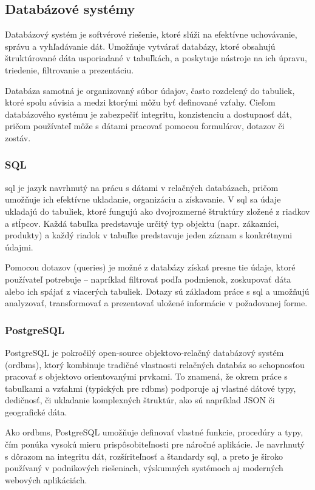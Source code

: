  \subsection{Databázové systémy}
 Databázový systém je softvérové riešenie, ktoré slúži na efektívne uchovávanie, správu a vyhľadávanie dát. 
 Umožňuje vytvárať databázy, ktoré obsahujú štruktúrované dáta usporiadané v tabuľkách, a poskytuje nástroje na ich úpravu, triedenie, filtrovanie a prezentáciu.
 
 Databáza samotná je organizovaný súbor údajov, často rozdelený do tabuliek, ktoré spolu súvisia a medzi ktorými môžu byť definované vzťahy. 
 Cieľom databázového systému je zabezpečiť integritu, konzistenciu a dostupnosť dát, pričom používateľ môže s dátami pracovať pomocou formulárov, dotazov či zostáv.\cite{databazovesystemy}
 
 \subsubsection{SQL}
 \acrfull{sql} je jazyk navrhnutý na prácu s dátami v relačných databázach, pričom umožňuje ich efektívne ukladanie, organizáciu a získavanie.
 V \acrshort{sql} sa údaje ukladajú do tabuliek, ktoré fungujú ako dvojrozmerné štruktúry zložené z riadkov a stĺpcov. 
 Každá tabuľka predstavuje určitý typ objektu (napr. zákazníci, produkty) a každý riadok v tabuľke predstavuje jeden záznam s konkrétnymi údajmi.
 
 Pomocou dotazov (queries) je možné z databázy získať presne tie údaje, ktoré používateľ potrebuje – napríklad filtrovať podľa podmienok, zoskupovať dáta alebo ich spájať z viacerých tabuliek.
 Dotazy sú základom práce s \acrshort{sql} a umožňujú analyzovať, transformovať a prezentovať uložené informácie v požadovanej forme.\cite{sql}
 
 \subsubsection{PostgreSQL}
 PostgreSQL je pokročilý open-source objektovo-relačný databázový systém (\acrshort{ordbms}), ktorý kombinuje tradičné vlastnosti relačných databáz so schopnosťou pracovať s objektovo orientovanými prvkami. 
 To znamená, že okrem práce s tabuľkami a vzťahmi (typických pre \acrfull{rdbms}) podporuje aj vlastné dátové typy, dedičnosť, či ukladanie komplexných štruktúr, ako sú napríklad JSON či geografické dáta.
 
 Ako \acrshort{ordbms}, PostgreSQL umožňuje definovať vlastné funkcie, procedúry a typy, čím ponúka vysokú mieru prispôsobiteľnosti pre náročné aplikácie. 
 Je navrhnutý s dôrazom na integritu dát, rozšíriteľnosť a štandardy \acrshort{sql}, a preto je široko používaný v podnikových riešeniach, výskumných systémoch aj moderných webových aplikáciách.\cite{postgre}
